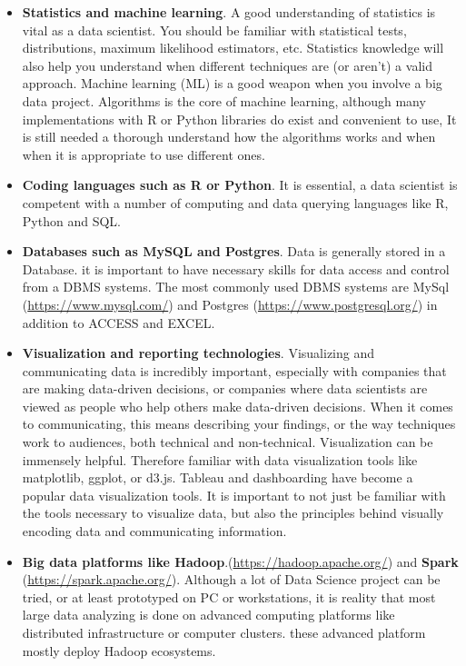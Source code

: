 \documentclass[
]{book}
\providecommand{\tightlist}{%
  \setlength{\itemsep}{0pt}\setlength{\parskip}{0pt}}
\begin{document}
\begin{itemize}
\tightlist
\item
  \textbf{Statistics and machine learning}. A good understanding of statistics is vital as a data scientist. You should be familiar with statistical tests, distributions, maximum likelihood estimators, etc. Statistics knowledge will also help you understand when different techniques are (or aren't) a valid approach. Machine learning (ML) is a good weapon when you involve a big data project. Algorithms is the core of machine learning, although many implementations with R or Python libraries do exist and convenient to use, It is still needed a thorough understand how the algorithms works and when when it is appropriate to use different ones.
\item
  \textbf{Coding languages such as R or Python}. It is essential, a data scientist is competent with a number of computing and data querying languages like R, Python and SQL.
\item
  \textbf{Databases such as MySQL and Postgres}. Data is generally stored in a Database. it is important to have necessary skills for data access and control from a DBMS systems. The most commonly used DBMS systems are MySql (\url{https://www.mysql.com/}) and Postgres (\url{https://www.postgresql.org/}) in addition to ACCESS and EXCEL.
\item
  \textbf{Visualization and reporting technologies}. Visualizing and communicating data is incredibly important, especially with companies that are making data-driven decisions, or companies where data scientists are viewed as people who help others make data-driven decisions. When it comes to communicating, this means describing your findings, or the way techniques work to audiences, both technical and non-technical. Visualization can be immensely helpful. Therefore familiar with data visualization tools like matplotlib, ggplot, or d3.js. Tableau and dashboarding have become a popular data visualization tools. It is important to not just be familiar with the tools necessary to visualize data, but also the principles behind visually encoding data and communicating information.
\item
  \textbf{Big data platforms like Hadoop}.(\url{https://hadoop.apache.org/}) and \textbf{Spark} (\url{https://spark.apache.org/}). Although a lot of Data Science project can be tried, or at least prototyped on PC or workstations, it is reality that most large data analyzing is done on advanced computing platforms like distributed infrastructure or computer clusters. these advanced platform mostly deploy Hadoop ecosystems.
\end{itemize}
\end{document}
